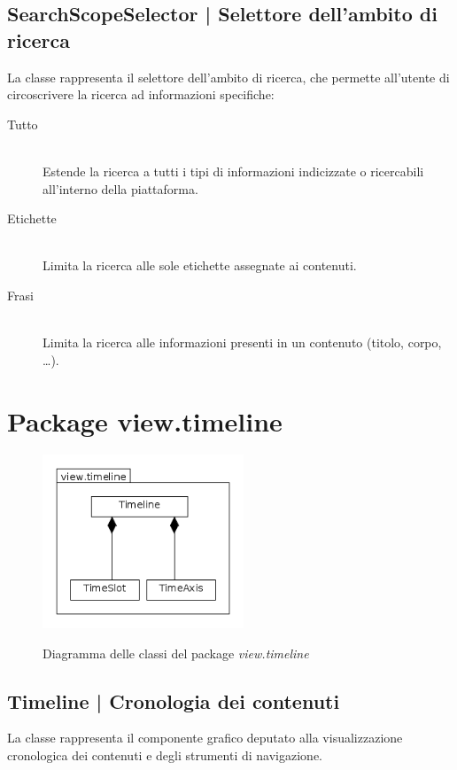 \documentclass[10pt,a4paper,headinclude,footinclude,hidelinks]{scrreprt} %
\begin{document}
	\subsection[SearchScopeSelector]{SearchScopeSelector | Selettore dell'ambito di ricerca}
	\label{sec:stage:design:view.search:search-scope-selector}
	La classe \textit{} rappresenta il selettore dell'ambito di ricerca, che permette all'utente di circoscrivere la ricerca ad informazioni specifiche:
	\begin{description}
	\item[Tutto] \hfill \\
	Estende la ricerca a tutti i tipi di informazioni indicizzate o ricercabili all'interno della piattaforma.
 	\item[Etichette] \hfill \\
	Limita la ricerca alle sole etichette assegnate ai contenuti.
	\item[Frasi] \hfill \\
	Limita la ricerca alle informazioni presenti in un contenuto (titolo, corpo, \ldots).
	\end{description}

	\section{Package view.timeline}
	\label{sec:stage:design:view.timeline}

	\begin{figure}[ht]
		\begin{center}
	    	\includegraphics[width=6cm]{class/view_timeline.png}
			\label{gfx:class:view:timeline}
			\caption{Diagramma delle classi del package \textit{view.timeline}}
		\end{center}
	\end{figure}

	\subsection[Timeline]{Timeline | Cronologia dei contenuti}
	\label{sec:stage:design:view.timeline:timeline-view}
	La classe \textit{} rappresenta il componente grafico deputato alla visualizzazione cronologica dei contenuti e degli strumenti di navigazione.
\end{document}
